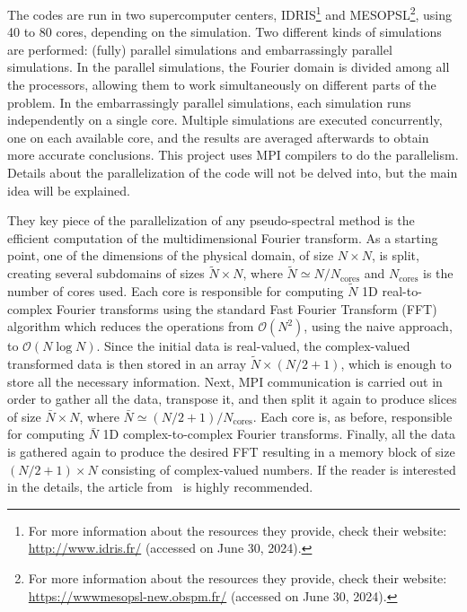 \documentclass[../main.tex]{subfiles}
\begin{document}
The codes are run in two supercomputer centers, IDRIS\footnote{For more information about the resources they provide, check their website: \url{http://www.idris.fr/} (accessed on June 30, 2024).} and MESOPSL\footnote{For more information about the resources they provide, check their website: \url{https://wwwmesopsl-new.obspm.fr/} (accessed on June 30, 2024).}, using 40 to 80 cores, depending on the simulation. Two different kinds of simulations are performed: (fully) parallel simulations and embarrassingly parallel simulations. In the parallel simulations, the Fourier domain is divided among all the processors, allowing them to work simultaneously on different parts of the problem. In the embarrassingly parallel simulations, each simulation runs independently on a single core. Multiple simulations are executed concurrently, one on each available core, and the results are averaged afterwards to obtain more accurate conclusions. This project uses MPI compilers to do the parallelism. Details about the parallelization of the code will not be delved into, but the main idea will be explained.

They key piece of the parallelization of any pseudo-spectral method is the efficient computation of the multidimensional Fourier transform. As a starting point, one of the dimensions of the physical domain, of size $N\times N$, is split, creating several subdomains of sizes $\tilde{N}\times N$, where $\tilde{N} \simeq N/N_\mathrm{cores}$ and $N_\mathrm{cores}$ is the number of cores used. Each core is responsible for computing $\tilde{N}$ 1D real-to-complex Fourier transforms using the standard Fast Fourier Transform (FFT) algorithm which reduces the operations from $\mathcal{O}(N^2)$, using the naive approach, to $\mathcal{O}(N\log N)$. Since the initial data is real-valued, the complex-valued transformed data is then stored in an array $\tilde{N}\times (N/2 + 1)$, which is enough to store all the necessary information. Next, MPI communication is carried out in order to gather all the data, transpose it, and then split it again to produce slices of size $\bar{N}\times N$, where $\bar{N} \simeq (N/2 + 1)/N_\mathrm{cores}$. Each core is, as before,
responsible for computing $\bar{N}$ 1D complex-to-complex Fourier transforms. Finally, all the data is gathered again to produce the desired FFT resulting in a memory block of size $(N/2 + 1)\times N$ consisting of complex-valued numbers. If the reader is interested in the details, the article from~\cite{mpi} is highly recommended.
\end{document}
